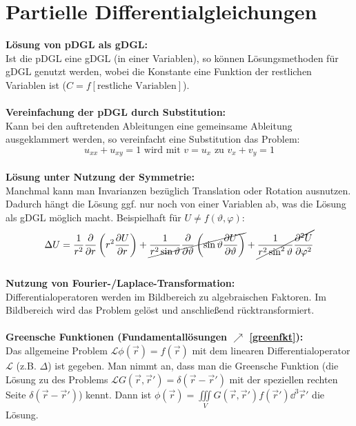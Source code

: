 \section{Partielle Differentialgleichungen}\label{pdgl}
\textbf{Lösung von pDGL als gDGL:}\\
Ist die pDGL eine gDGL (in einer Variablen), so können Lösungsmethoden für gDGL genutzt werden, wobei die Konstante eine Funktion der restlichen Variablen ist ($C=f[\text{restliche Variablen}]$).\\\\
\textbf{Vereinfachung der pDGL durch Substitution:}\\
Kann bei den auftretenden Ableitungen eine gemeinsame Ableitung ausgeklammert werden, so vereinfacht eine Substitution das Problem:
\begin{equation}
	u_{xx}+u_{xy}=1 \text{ wird mit } v=u_x \text{ zu } v_x+v_y=1
\end{equation}\\
\textbf{Lösung unter Nutzung der Symmetrie:}\\
Manchmal kann man Invarianzen bezüglich Translation oder Rotation ausnutzen. Dadurch hängt die Lösung ggf. nur noch von einer Variablen ab, was die Lösung als gDGL möglich macht. Beispielhaft für $U\neq f(\vartheta,\varphi)$:
\begin{equation}
	\Delta U = \frac{1}{r^2} \frac{\partial}{\partial r}\left(r^2 \frac{\partial U}{\partial r}\right) 
	+\cancel{\frac{1}{r^2 \sin \vartheta} \frac{\partial}{\partial \vartheta}\left(\sin \vartheta \frac{\partial U}{\partial \vartheta}\right) }
	+\cancel{\frac{1}{r^2 \sin ^2 \vartheta} \frac{\partial^2 U}{\partial \varphi^2}}
\end{equation}\\
\textbf{Nutzung von Fourier-/Laplace-Transformation:}\\
Differentialoperatoren werden im Bildbereich zu algebraischen Faktoren. Im Bildbereich wird das Problem gelöst und anschließend rücktransformiert.\\\\
\textbf{Greensche Funktionen (Fundamentallösungen $\nearrow$ \ref{greenfkt}):}\\
Das allgemeine Problem $\mathcal{L}\phi(\vec{r})=f(\vec{r})$ mit dem linearen Differentialoperator $\mathcal{L}$ (z.B. $\Delta$) ist gegeben. Man nimmt an, dass man die Greensche Funktion (die Lösung zu des Problems $\mathcal{L}G(\vec{r},\vec{r}\prime)=\delta(\vec{r}-\vec{r}\prime)$ mit der speziellen rechten Seite $\delta(\vec{r}-\vec{r}\prime)$) kennt. Dann ist $\phi(\vec{r})=\iiint\limits_V G(\vec{r},\vec{r}\prime)f(\vec{r}\prime)\dd^3\vec{r}\prime$ die Lösung.


